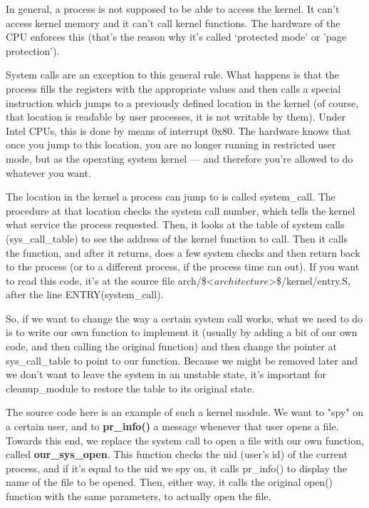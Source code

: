 \documentclass[10pt, oneside]{book}
\begin{document}
In general, a process is not supposed to be able to access the kernel. It can't access kernel memory and it can't call kernel functions. The hardware of the CPU enforces this (that's the reason why it's called `protected mode' or 'page protection').

System calls are an exception to this general rule. What happens is that the process fills the registers with the appropriate values and then calls a special instruction which jumps to a previously defined location in the kernel (of course, that location is readable by user processes, it is not writable by them). Under Intel CPUs, this is done by means of interrupt 0x80. The hardware knows that once you jump to this location, you are no longer running in restricted user mode, but as the operating system kernel --- and therefore you're allowed to do whatever you want.

The location in the kernel a process can jump to is called system\_call. The procedure at that location checks the system call number, which tells the kernel what service the process requested. Then, it looks at the table of system calls (sys\_call\_table) to see the address of the kernel function to call. Then it calls the function, and after it returns, does a few system checks and then return back to the process (or to a different process, if the process time ran out). If you want to read this code, it's at the source file arch/\$<\(architecture\)>\$/kernel/entry.S, after the line ENTRY(system\_call).

So, if we want to change the way a certain system call works, what we need to do is to write our own function to implement it (usually by adding a bit of our own code, and then calling the original function) and then change the pointer at sys\_call\_table to point to our function. Because we might be removed later and we don't want to leave the system in an unstable state, it's important for cleanup\_module to restore the table to its original state.

The source code here is an example of such a kernel module. We want to "spy" on a certain user, and to \textbf{pr\_info()} a message whenever that user opens a file. Towards this end, we replace the system call to open a file with our own function, called \textbf{our\_sys\_open}. This function checks the uid (user's id) of the current process, and if it's equal to the uid we spy on, it calls pr\_info() to display the name of the file to be opened. Then, either way, it calls the original open() function with the same parameters, to actually open the file.
\end{document}
